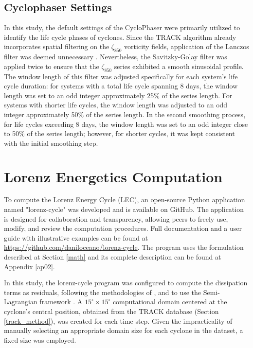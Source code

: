\subsection{Cyclophaser Settings} \label{sec:cyclophaser_settings}

In this study, the default settings of the CycloPhaser were primarily utilized to identify the life cycle phases of cyclones. Since the TRACK algorithm already incorporates spatial filtering on the \(\zeta_{850}\) vorticity fields, application of the Lanczos filter was deemed unnecessary \citep{hodges1994general, hodges1995feature}. Nevertheless, the Savitzky-Golay filter was applied twice to ensure that the \(\zeta_{850}\) series exhibited a smooth sinusoidal profile. The window length of this filter was adjusted specifically for each system's life cycle duration: for systems with a total life cycle spanning 8 days, the window length was set to an odd integer approximately 25\% of the series length. For systems with shorter life cycles, the window length was adjusted to an odd integer approximately 50\% of the series length. In the second smoothing process, for life cycles exceeding 8 days, the window length was set to an odd integer close to 50\% of the series length; however, for shorter cycles, it was kept consistent with the initial smoothing step.

\section{Lorenz Energetics Computation}\label{sec:lec_computation}

To compute the Lorenz Energy Cycle (LEC), an open-source Python application named "lorenz-cycle" was developed and is available on GitHub. The application is designed for collaboration and transparency, allowing peers to freely use, modify, and review the computation procedures. Full documentation and a user guide with illustrative examples can be found at \url{https://github.com/daniloceano/lorenz-cycle}. The program uses the formulation described at Section \ref{math} and its complete description can be found at Appendix \ref{ap02}.

In this study, the lorenz-cycle program was configured to compute the dissipation terms as residuals, following the methodologies of \citet{brennan1980zonal,michaelides1987limited,veiga2008analysis,pezza2010environmental,dias2011energy}, and to use the Semi-Lagrangian framework \citep{michaelides1999quasi}. A $15^\circ \times 15^\circ$ computational domain centered at the cyclone's central position, obtained from the TRACK database (Section \ref{track_method}), was created for each time step. Given the impracticality of manually selecting an appropriate domain size for each cyclone in the dataset, a fixed size was employed.

